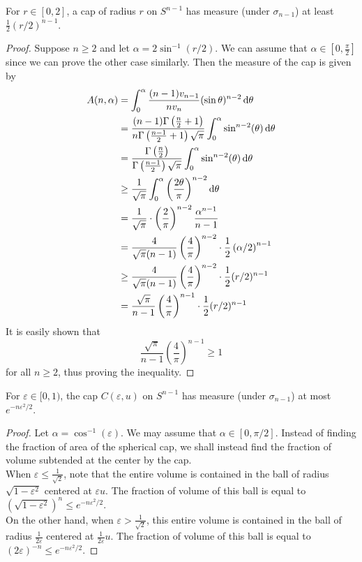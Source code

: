 \begin{lemma}
\label{spherical cap lower bound}
For $r\in[0,2]$, a cap of radius $r$ on $S^{n-1}$ has measure (under $\sigma_{n-1}$) at least $\frac{1}{2}(r/2)^{n-1}$.
\end{lemma}
\begin{proof}
Suppose $n\geq 2$ and let $\alpha =2\sin^{-1}(r/2)$. We can assume that $\alpha\in [0,\frac{\pi}{2}]$ since we can prove the other case similarly. Then the measure of the cap is given by
\begin{align*}
    A(n,\alpha) &= \int_0^\alpha \frac{(n-1)v_{n-1}}{nv_n} (\sin\theta)^{n-2}\operatorname{d}\!{\theta}\\
        &= \frac{(n-1)\Gamma\left(\frac{n}{2}+1\right)}{n\Gamma\left(\frac{n-1}{2}+1\right)\sqrt{\pi}}\int_0^\alpha \sin^{n-2}(\theta)\operatorname{d}\!{\theta} \\
        &= \frac{\Gamma\left(\frac{n}{2}\right)}{\Gamma\left(\frac{n-1}{2}\right)\sqrt{\pi}}\int_0^\alpha \sin^{n-2}(\theta)\operatorname{d}\!{\theta} \\
        &\geq \frac{1}{\sqrt{\pi}}\int_0^\alpha \left(\frac{2\theta}{\pi}\right)^{n-2} \operatorname{d}\!{\theta} \\
        &= \frac{1}{\sqrt{\pi}}\cdot \left(\frac{2}{\pi}\right)^{n-2}\frac{\alpha^{n-1}}{n-1} \\
        &= \frac{4}{\sqrt{\pi}(n-1)} \left(\frac{4}{\pi}\right)^{n-2}\cdot \frac{1}{2}\left(\alpha/2\right)^{n-1} \\
        &\geq \frac{4}{\sqrt{\pi}(n-1)} \left(\frac{4}{\pi}\right)^{n-2}\cdot \frac{1}{2}(r/2)^{n-1} \\
        &= \frac{\sqrt{\pi}}{n-1} \left(\frac{4}{\pi}\right)^{n-1}\cdot \frac{1}{2}(r/2)^{n-1}
\end{align*}
It is easily shown that
\[ \frac{\sqrt{\pi}}{n-1} \left(\frac{4}{\pi}\right)^{n-1} \geq 1\]
for all $n\geq 2$, thus proving the inequality.
\end{proof}


\begin{lemma}
\label{spherical cap upper bound}
For $\varepsilon\in[0,1)$, the cap $C(\varepsilon,u)$ on $S^{n-1}$ has measure (under $\sigma_{n-1}$) at most $e^{-n\varepsilon^2/2}$.
\end{lemma}
\begin{proof}
Let $\alpha=\cos^{-1}(\varepsilon)$. We may assume that $\alpha\in[0,\pi/2]$. Instead of finding the fraction of area of the spherical cap, we shall instead find the fraction of volume subtended at the center by the cap.\\
When $\varepsilon\leq\frac{1}{\sqrt{2}}$, note that the entire volume is contained in the ball of radius $\sqrt{1-\varepsilon^2}$ centered at $\varepsilon u$. The fraction of volume of this ball is equal to $\left(\sqrt{1-\varepsilon^2}\right)^n\leq e^{-n\varepsilon^2/2}$.\\
On the other hand, when $\varepsilon>\frac{1}{\sqrt{2}}$, this entire volume is contained in the ball of radius $\frac{1}{2\varepsilon}$ centered at $\frac{1}{2\varepsilon} u$. The fraction of volume of this ball is equal to $(2\varepsilon)^{-n} \leq e^{-n\varepsilon^2/2}$.
\end{proof}


